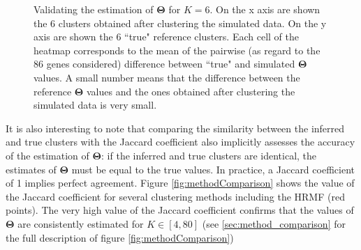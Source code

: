 \begin{figure}[bth]
        \myfloatalign
         \quad
        \caption{Validating the estimation of $\boldsymbol{\Theta}$ for $K=6$. On the x axis are shown the 6 clusters obtained after clustering the simulated data. On the y axis are shown the 6 ``true" reference clusters. Each cell of the heatmap corresponds to the mean of the pairwise (as regard to the 86 genes considered) difference between ``true" and simulated $\boldsymbol{\Theta}$ values. A small number means that the difference between the reference $\boldsymbol{\Theta}$ values and the ones obtained after clustering the simulated data is very small.}\label{fig:theta_valid}
\end{figure}
	
	It is also interesting to note that comparing the similarity between the inferred and true clusters with the Jaccard coefficient also implicitly assesses the accuracy of the estimation of $\boldsymbol{\Theta}$: if the inferred and true clusters are identical, the estimates of $\boldsymbol{\Theta}$ must be equal to the true values. In practice, a Jaccard coefficient of 1 implies perfect agreement. Figure \ref{fig:methodComparison} shows the value of the Jaccard coefficient for several clustering methods including the HRMF (red points). The very high value of the Jaccard coefficient confirms that the values of $\boldsymbol{\Theta}$ are consistently estimated for $K \in [4,80]$ (see \ref{sec:method_comparison} for the full description of figure \ref{fig:methodComparison})\\
	

